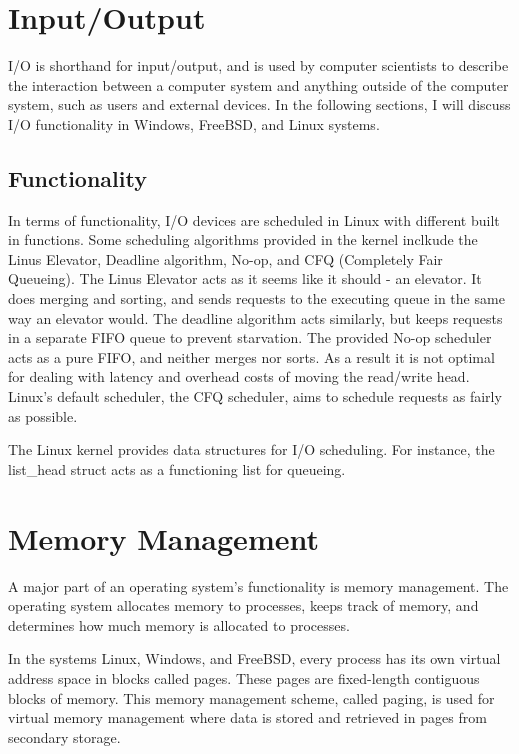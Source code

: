 \documentclass[journal, letterpaper, draftclsnofoot, onecolumn, 10pt]{IEEEtran}
\begin{document}
\section{Input/Output}

I/O is shorthand for input/output, and is used by computer scientists to describe the interaction between a computer system and anything outside of the computer system, such as users and external devices.
In the following sections, I will discuss I/O functionality in Windows, FreeBSD, and Linux systems.

\subsection{Functionality}

In terms of functionality, I/O devices are scheduled in Linux with different built in functions. Some scheduling algorithms provided in the kernel inclkude the Linus Elevator, Deadline algorithm, No-op, and CFQ (Completely Fair Queueing).
The Linus Elevator acts as it seems like it should - an elevator. It does merging and sorting, and sends requests to the executing queue in the same way an elevator would. The deadline algorithm acts similarly, but keeps requests in a separate FIFO queue to
prevent starvation. The provided No-op scheduler acts as a pure FIFO, and neither merges nor sorts. As a result it is not optimal for dealing with latency and overhead costs of moving the read/write head. Linux's default scheduler, the CFQ scheduler, aims to schedule requests as fairly as possible.

The Linux kernel provides data structures for I/O scheduling. For instance, the list\_head struct acts as a functioning list for queueing.


\section{Memory Management}

A major part of an operating system's functionality is memory management.
The operating system allocates memory to processes, keeps track of memory, and determines how much memory is allocated to processes.

In the systems Linux, Windows, and FreeBSD, every process has its own virtual address space in blocks called pages. These pages are fixed-length contiguous blocks of memory. This memory management scheme, called paging, is used for virtual memory management where data is stored and retrieved in pages from secondary storage. \\
\end{document}
